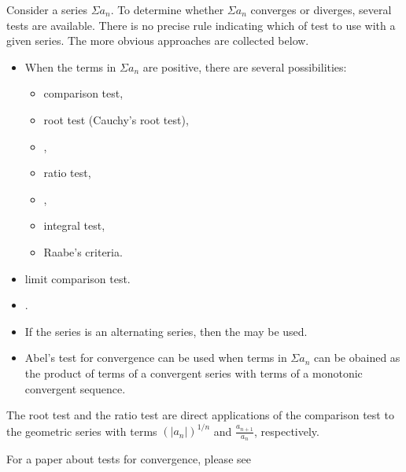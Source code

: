 \documentclass[12pt]{article}
\def\ser{\Sigma a_n}
\begin{document}
Consider a series $\ser$. To determine whether $\ser$ converges or diverges, several tests are available. There is no precise rule indicating which  of test to use with a given series. The more obvious approaches are collected below.

\begin{itemize}
\item When the terms in $\ser$ are positive, there are several possibilities:
\begin{itemize}
\item comparison test,
\item root test (Cauchy's root test),
\item {},
\item ratio test,
\item {},
\item integral test,
\item Raabe's criteria.
\end{itemize} 
\item limit comparison test.
\item {}.
\item If the series is an alternating series, then the  may be used.
\item Abel's test for convergence can be used when terms in $\ser$ can be obained as the product of terms of a convergent series with terms of a monotonic convergent sequence.
\end{itemize}

The root test and the ratio test are direct applications of the comparison test to the geometric series with terms $(|a_n|)^{1/n}$ and $\frac{a_{n+1}}{a_n}$, respectively.

For a paper about tests for convergence, please see 
\end{document}
